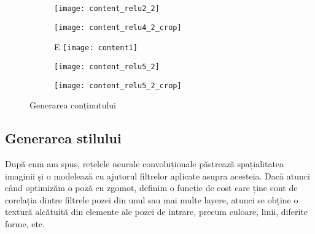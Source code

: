 \begin{figure}[h]
\begin{subfigure}[b]{0.3\textwidth}
        \label{fig:content}
	\end{subfigure}
    \hfill
    \begin{subfigure}[b]{0.3\textwidth}
		\centering
        \texttt{[image: content\_relu2\_2]}
        \label{fig:content_relu4_2}
	\end{subfigure}
    \hfill
    \begin{subfigure}[b]{0.3\textwidth}
		\centering
        \texttt{[image: content\_relu4\_2\_crop]}
        \label{fig:content_relu4_2_crop}
	\end{subfigure}
    \begin{subfigure}[b]{0.3\textwidth}
    	E
		\centering
        \texttt{[image: content1]}
        \label{fig:content}
	\end{subfigure}
    \hfill
    \begin{subfigure}[b]{0.3\textwidth}
		\centering
        \texttt{[image: content\_relu5\_2]}
        \label{fig:content_relu5_2}
	\end{subfigure}
    \hfill
    \begin{subfigure}[b]{0.3\textwidth}
		\centering
        \texttt{[image: content\_relu5\_2\_crop]}
        \label{fig:content_relu5_2_crop}
	\end{subfigure}
    \caption{Generarea conținutului}
    \label{fig:content_rec}
\end{figure}

\subsection{Generarea stilului}
\label{ss:gens}
După cum am spus, rețelele neurale convoluționale păstrează spațialitatea imaginii și o modelează cu ajutorul filtrelor aplicate asupra acesteia. Dacă atunci când optimizăm o poză cu zgomot, definim o funcție de cost care ține cont de corelația dintre filtrele pozei din unul sau mai multe layere, atunci se obține o textură alcătuită din elemente ale pozei de intrare, precum culoare, linii, diferite forme, etc. \cite{gatys_texture2015}


